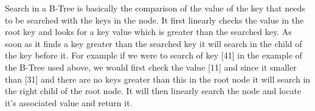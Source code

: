 Search in a B-Tree is basically the comparison of the value of the key that needs to be searched with the keys in the node. It first linearly checks the value in the root key and looks for a key value which is greater than the searched key. As soon as it finds a key greater than the searched key it will search in the child of the key before it. For example if we were to search of key [41] in the example of the B-Tree used above, we would first check the value [11] and since it smaller than [31] and there are no keys greater than this in the root node it will search in the right child of the root node. It will then linearly search the node and locate it's associated value and return it. 